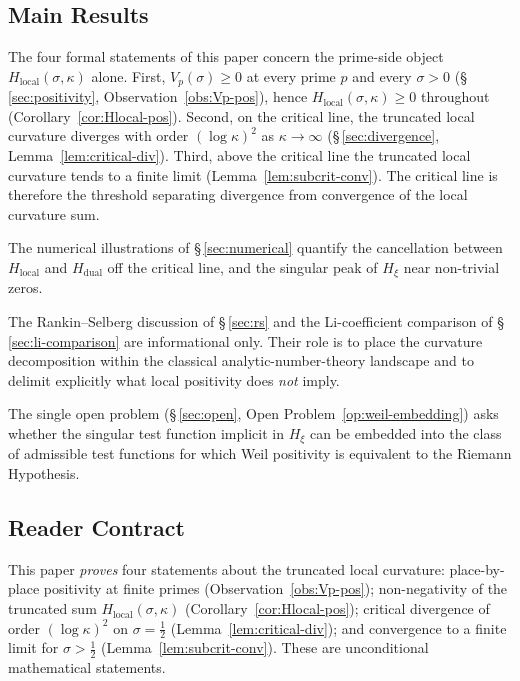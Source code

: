 \documentclass[11pt]{article}
\newcommand{\Hxi}{H_{\xi}}
\newcommand{\Hlocal}{H_{\mathrm{local}}}
\newcommand{\Hdual}{H_{\mathrm{dual}}}
\begin{document}
\subsection{Main Results}
\label{sec:main}

The four formal statements of this paper concern the
prime-side object $\Hlocal(\sigma,\kappa)$ alone.
First, $V_p(\sigma)\ge 0$ at every prime $p$ and every
$\sigma>0$ (\S\,\ref{sec:positivity}, Observation~\ref{obs:Vp-pos}),
hence $\Hlocal(\sigma,\kappa)\ge 0$ throughout
(Corollary~\ref{cor:Hlocal-pos}).
Second, on the critical line, the truncated local curvature
diverges with order $(\log\kappa)^{2}$ as $\kappa\to\infty$
(\S\,\ref{sec:divergence}, Lemma~\ref{lem:critical-div}).
Third, above the critical line the truncated local curvature
tends to a finite limit
(Lemma~\ref{lem:subcrit-conv}).
The critical line is therefore the threshold separating
divergence from convergence of the local curvature sum.

The numerical illustrations of \S\,\ref{sec:numerical}
quantify the cancellation between $\Hlocal$ and $\Hdual$
off the critical line, and the singular peak of $\Hxi$ near
non-trivial zeros.

The Rankin--Selberg discussion of \S\,\ref{sec:rs} and the
Li-coefficient comparison of \S\,\ref{sec:li-comparison} are
informational only.
Their role is to place the curvature decomposition within the
classical analytic-number-theory landscape and to delimit
explicitly what local positivity does \emph{not} imply.

The single open problem
(\S\,\ref{sec:open}, Open Problem~\ref{op:weil-embedding})
asks whether the singular test function implicit in $\Hxi$
can be embedded into the class of admissible test functions
for which Weil positivity is equivalent to the Riemann
Hypothesis.

\subsection{Reader Contract}
\label{sec:contract}

This paper \emph{proves} four statements about the truncated
local curvature: place-by-place positivity at finite primes
(Observation~\ref{obs:Vp-pos}); non-negativity of the truncated
sum $\Hlocal(\sigma,\kappa)$ (Corollary~\ref{cor:Hlocal-pos});
critical divergence of order $(\log\kappa)^{2}$ on
$\sigma=\tfrac12$ (Lemma~\ref{lem:critical-div}); and
convergence to a finite limit for $\sigma>\tfrac12$
(Lemma~\ref{lem:subcrit-conv}).
These are unconditional mathematical statements.
\end{document}
